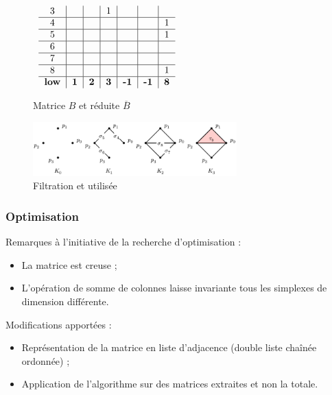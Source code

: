 \documentclass{beamer}
\begin{document}
\begin{frame}
\begin{figure}
\begin{math}
\begin{array}{cc}
\begin{tabular}{ c | c | c | c | c | c | c }
                3 &   &   & 1 &   &   &   \\ \hline
                4 &   &   &   &   &   & 1 \\ \hline
                5 &   &   &   &   &   & 1 \\ \hline
                6 &   &   &   &   &   &   \\ \hline
                7 &   &   &   &   &   &   \\ \hline
                8 &   &   &   &   &   & 1  \\ \hline
                \textbf{low} & \textbf{1} & \textbf{2} & \textbf{3} & 
                \textbf{-1} & \textbf{-1} & \textbf{8}
            \end{tabular}
        \end{array}
        \end{math}
        \caption{Matrice $B$ et réduite $\overline{B}$}
    \end{figure}
    \begin{figure}
        \centering
        \includegraphics[width=0.7\textwidth]{../images/filtration_horizontal.png}
        \caption{Filtration et utilisée}
    \end{figure}
\end{frame}

\begin{frame}
    \frametitle{Optimisation}
    Remarques à l'initiative de la recherche d'optimisation :
    \begin{itemize}
        \item La matrice est creuse ;
        \item L'opération de somme de colonnes laisse invariante tous les simplexes de dimension différente.
    \end{itemize}

    Modifications apportées :
    \begin{itemize}
        \item Représentation de la matrice en liste d'adjacence (double liste chaînée ordonnée) ;
        \item Application de l'algorithme sur des matrices extraites et non la totale.
    \end{itemize}
\end{frame}
\end{document}
